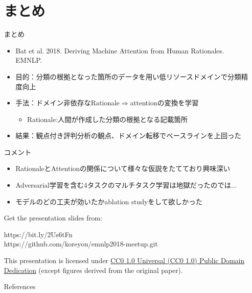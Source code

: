 \section{まとめ}
\frame[standout]{\insertsection}

\begin{frame}{まとめ}
\begin{itemize}
\item Bat et al. 2018. Deriving Machine Attention from Human Rationales. EMNLP.
\item 目的：分類の根拠となった箇所のデータを用い低リソースドメインで分類精度向上
\item 手法：ドメイン非依存なRationale$\Rightarrow$attentionの変換を学習
\begin{itemize}
\item Rationale:人間が作成した分類の根拠となる記載箇所
\end{itemize}
\item 結果：観点付き評判分析の観点、ドメイン転移でベースラインを上回った
\end{itemize}
\end{frame}

\begin{frame}{コメント}
\begin{itemize}
\item RationaleとAttentionの関係について様々な仮説をたてており興味深い
\item Adversarial学習を含む4タスクのマルチタスク学習は地獄だったのでは...
\item モデルのどの工夫が効いたかablation studyをして欲しかった
\end{itemize}

\end{frame}


\begin{frame}[c]

  Get the presentation slides from:

  \begin{center}https://bit.ly/2Us6tFn\\
  https://github.com/koreyou/emnlp2018-meetup.git\end{center}

  This presentation is licensed under
    \href{https://creativecommons.org/publicdomain/zero/1.0/}{
    CC0 1.0 Universal (CC0 1.0) Public Domain Dedication}
    {\scriptsize (except figures derived from the original paper\cite{bao_2018})}.

  \begin{center}\cczero\end{center}

\end{frame}

\begin{frame}[allowframebreaks]{References}
  \printbibliography[heading=none]
\end{frame}



